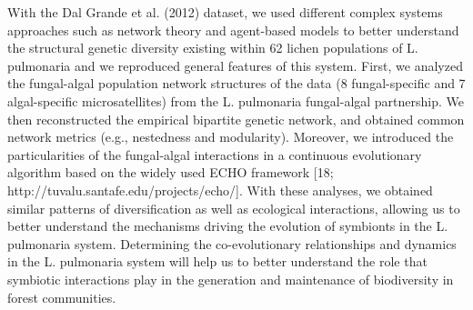 With the Dal Grande et al. (2012) dataset, we used different complex systems approaches such as network theory and agent-based models to better understand the structural genetic diversity existing within 62 lichen populations of L. pulmonaria and we reproduced general features of this system. First, we analyzed the fungal-algal population network structures of the data (8 fungal-specific and 7 algal-specific microsatellites) from the L. pulmonaria fungal-algal partnership. We then reconstructed the empirical bipartite genetic network, and obtained common network metrics (e.g., nestedness and modularity). Moreover, we introduced the particularities of the fungal-algal interactions in a continuous evolutionary algorithm based on the widely used ECHO framework [18; http://tuvalu.santafe.edu/projects/echo/]. With these analyses, we obtained similar patterns of diversification as well as ecological interactions, allowing us to better understand the mechanisms driving the evolution of symbionts in the L. pulmonaria system. Determining the co-evolutionary relationships and dynamics in the L. pulmonaria system will help us to better understand the role that symbiotic interactions play in the generation and maintenance of biodiversity in forest communities.


